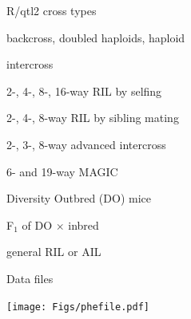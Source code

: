 \documentclass[12pt,t,aspectratio=169]{beamer}
\begin{document}
\begin{frame}[c]{}



\end{frame}



\begin{frame}{R/qtl2 cross types}

\vspace*{10mm}

\bi
\item backcross, doubled haploids, haploid

\item intercross

\item 2-, 4-, 8-, 16-way RIL by selfing

\item 2-, 4-, 8-way RIL by sibling mating

\item 2-, 3-, 8-way advanced intercross

\item 6- and 19-way MAGIC

\item Diversity Outbred (DO) mice

\item F$_1$ of DO $\times$ inbred

\item general RIL or AIL
\ei

\end{frame}










\begin{frame}{Data files}

\texttt{[image: Figs/phefile.pdf]}






\end{frame}
\end{document}
